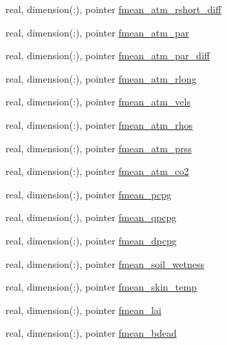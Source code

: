 \begin{DoxyCompactItemize}
\item 
real, dimension(\+:), pointer \hyperlink{structed__state__vars_1_1edtype_ae9fd8b783737547cf6e279f8b053ca7e}{fmean\+\_\+atm\+\_\+rshort\+\_\+diff}
\item 
real, dimension(\+:), pointer \hyperlink{structed__state__vars_1_1edtype_a577b7215a5453232d477652d9d2b6878}{fmean\+\_\+atm\+\_\+par}
\item 
real, dimension(\+:), pointer \hyperlink{structed__state__vars_1_1edtype_aa1964ef9f8516ba0d7466535cd336a90}{fmean\+\_\+atm\+\_\+par\+\_\+diff}
\item 
real, dimension(\+:), pointer \hyperlink{structed__state__vars_1_1edtype_a42fa2347acb910e75402f2ccef733291}{fmean\+\_\+atm\+\_\+rlong}
\item 
real, dimension(\+:), pointer \hyperlink{structed__state__vars_1_1edtype_a0e841731528a57a1da0558c17492ab07}{fmean\+\_\+atm\+\_\+vels}
\item 
real, dimension(\+:), pointer \hyperlink{structed__state__vars_1_1edtype_ae89e1dcbc6acf5e3cfdf5bb188823c6d}{fmean\+\_\+atm\+\_\+rhos}
\item 
real, dimension(\+:), pointer \hyperlink{structed__state__vars_1_1edtype_a592319c15c66fb1e2437a9a8cb34f71c}{fmean\+\_\+atm\+\_\+prss}
\item 
real, dimension(\+:), pointer \hyperlink{structed__state__vars_1_1edtype_a5b87bc2f16adda305bdb5f873fac32d7}{fmean\+\_\+atm\+\_\+co2}
\item 
real, dimension(\+:), pointer \hyperlink{structed__state__vars_1_1edtype_aab5ec0e3574e8230a0b1a83f57e08aae}{fmean\+\_\+pcpg}
\item 
real, dimension(\+:), pointer \hyperlink{structed__state__vars_1_1edtype_a6ad6a54a6d82f8cc50ed0cad59b96bb9}{fmean\+\_\+qpcpg}
\item 
real, dimension(\+:), pointer \hyperlink{structed__state__vars_1_1edtype_a07f071d0de72fb08cb6ae82dbf4b005c}{fmean\+\_\+dpcpg}
\item 
real, dimension(\+:), pointer \hyperlink{structed__state__vars_1_1edtype_af89c430f37b8fa2f9b6655a323bf5f6a}{fmean\+\_\+soil\+\_\+wetness}
\item 
real, dimension(\+:), pointer \hyperlink{structed__state__vars_1_1edtype_aeefec97bb7bb2fcb5abd0e0eadb1c30b}{fmean\+\_\+skin\+\_\+temp}
\item 
real, dimension(\+:), pointer \hyperlink{structed__state__vars_1_1edtype_ae30f7d13b819ab27be615758c27a5963}{fmean\+\_\+lai}
\item 
real, dimension(\+:), pointer \hyperlink{structed__state__vars_1_1edtype_a68d9f11a3fa537c55c8b6b011f91ef18}{fmean\+\_\+bdead}

\end{DoxyCompactItemize}
